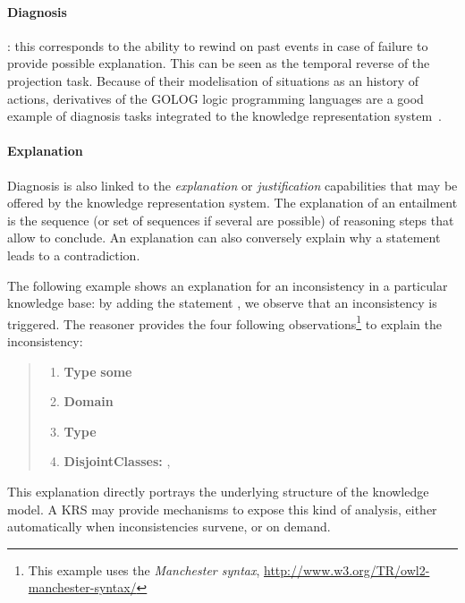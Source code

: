 \paragraph{Diagnosis}: this corresponds to the ability to rewind on past events
in case of failure to provide possible explanation. This can be seen as the
temporal reverse of the projection task. Because of their modelisation of
situations as an history of actions, derivatives of the GOLOG logic programming
languages are a good example of diagnosis tasks integrated to the knowledge
representation system~\cite{Gspandl2011}.

\paragraph{Explanation} Diagnosis is also linked to the \emph{explanation} or
\emph{justification} capabilities that may be offered by the knowledge
representation system. The explanation of an entailment is the sequence (or
set of sequences if several are possible) of reasoning steps that allow to
conclude. An explanation can also conversely explain why a statement leads to a
contradiction.

The following example shows an explanation for an inconsistency in a particular
knowledge base: by adding the statement , we
observe that an inconsistency is triggered. The reasoner provides the four
following observations\footnote{This example uses the \emph{Manchester syntax},
\url{http://www.w3.org/TR/owl2-manchester-syntax/}} to explain the
inconsistency:

\begin{quote}
\scriptsize
\begin{enumerate}
    \item {} {\bf Type}  {\bf some} 
    \item {} {\bf Domain} 
    \item {} {\bf Type} 
    \item {\bf DisjointClasses:} , 
\end{enumerate}
\normalsize
\end{quote}

This explanation directly portrays the underlying structure of the knowledge
model. A KRS may provide mechanisms to expose this kind of analysis, either
automatically when inconsistencies survene, or on demand.


